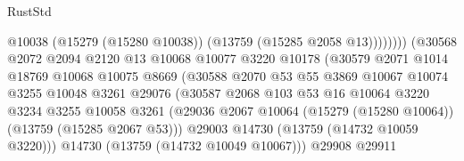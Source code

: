 \begin{lexlean}{RustStd}
\begin{coremodule}
                                              @10038
                                              (@15279 (@15280 @10038))
                                              (@13759 (@15285 @2058 @13))))))))
                                  (@30568
                                    @2072
                                    @2094
                                    @2120
                                    @13
                                    @10068
                                    @10077
                                    @3220
                                    @10178
                                    (@30579
                                      @2071
                                      @1014
                                      @18769
                                      @10068
                                      @10075
                                      @8669
                                      (@30588
                                        @2070
                                        @53
                                        @55
                                        @3869
                                        @10067
                                        @10074
                                        @3255
                                        @10048
                                        @3261
                                        @29076
                                        (@30587
                                          @2068
                                          @103
                                          @53
                                          @16
                                          @10064
                                          @3220
                                          @3234
                                          @3255
                                          @10058
                                          @3261
                                          (@29036
                                            @2067
                                            @10064
                                            (@15279 (@15280 @10064))
                                            (@13759 (@15285 @2067 @53)))
                                          @29003
                                          @14730
                                          (@13759 (@14732 @10059 @3220)))
                                        @14730
                                        (@13759 (@14732 @10049 @10067)))
                                      @29908
                                      @29911

\end{coremodule}
\end{lexlean}
